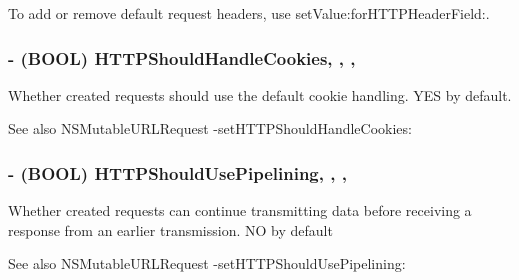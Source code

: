 To add or remove default request headers, use {\ttfamily set\+Value\+:for\+H\+T\+T\+P\+Header\+Field\+:}. \hypertarget{interface_a_f_h_t_t_p_request_serializer_a87ed9e46c52d429016869a7d2bc46b97}{}
\subsubsection[{H\+T\+T\+P\+Should\+Handle\+Cookies}]{\setlength{\rightskip}{0pt plus 5cm}-\/ (B\+O\+O\+L) H\+T\+T\+P\+Should\+Handle\+Cookies\hspace{0.3cm}{\ttfamily [read]}, {\ttfamily [write]}, {\ttfamily [nonatomic]}, {\ttfamily [assign]}}\label{interface_a_f_h_t_t_p_request_serializer_a87ed9e46c52d429016869a7d2bc46b97}
Whether created requests should use the default cookie handling. {\ttfamily Y\+E\+S} by default.

\begin{DoxySeeAlso}{See also}
N\+S\+Mutable\+U\+R\+L\+Request -\/set\+H\+T\+T\+P\+Should\+Handle\+Cookies\+: 
\end{DoxySeeAlso}
\hypertarget{interface_a_f_h_t_t_p_request_serializer_aff714e6d87d3063daa6ba8c5e504ec4e}{}
\subsubsection[{H\+T\+T\+P\+Should\+Use\+Pipelining}]{\setlength{\rightskip}{0pt plus 5cm}-\/ (B\+O\+O\+L) H\+T\+T\+P\+Should\+Use\+Pipelining\hspace{0.3cm}{\ttfamily [read]}, {\ttfamily [write]}, {\ttfamily [nonatomic]}, {\ttfamily [assign]}}\label{interface_a_f_h_t_t_p_request_serializer_aff714e6d87d3063daa6ba8c5e504ec4e}
Whether created requests can continue transmitting data before receiving a response from an earlier transmission. {\ttfamily N\+O} by default

\begin{DoxySeeAlso}{See also}
N\+S\+Mutable\+U\+R\+L\+Request -\/set\+H\+T\+T\+P\+Should\+Use\+Pipelining\+: 
\end{DoxySeeAlso}
\hypertarget{interface_a_f_h_t_t_p_request_serializer_a5606b2650ff3860a4ae94ea06f2b1d9c}{}

